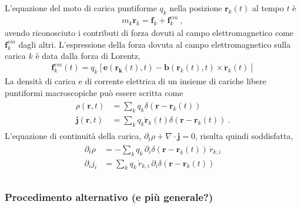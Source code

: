 \documentclass[letterpaper,10pt,italian]{jupyterBook}
\begin{document}
\sphinxAtStartPar
{}
L’equazione del moto di carica puntiforme \(q_k\) nella posizione \(\mathbf{r}_k(t)\) al tempo \(t\) è
\begin{equation*}
\begin{split}m_k \ddot{\mathbf{r}}_k = \mathbf{f}_k + \mathbf{f}_k^{em} \ ,\end{split}
\end{equation*}
\sphinxAtStartPar
avendo riconosciuto i contributi di forza dovuti al campo elettromagnetico come \(\mathbf{f}_k^{em}\) dagli altri. L’espressione della forza dovuta al campo elettromagnetico sulla carica \(k\) è data dalla forza di Lorentz,
\begin{equation*}
\begin{split}\mathbf{f}_k^{em}(t) = q_k \left[ \mathbf{e}(\mathbf{r_k}(t), t) - \mathbf{b}(\mathbf{r}_k(t), t) \times \dot{\mathbf{r}}_k(t) \right]\end{split}
\end{equation*}
\sphinxAtStartPar
{} La densità di carica e di corrente elettrica di un insieme di cariche libere puntiformi macroscopiche può essere scritta come
\begin{equation*}
\begin{split}\begin{aligned}
  \rho(\mathbf{r},t) & = \sum_k q_k \delta(\mathbf{r} - \mathbf{r}_k(t)) \\
  \mathbf{j}(\mathbf{r},t) & = \sum_k q_k \dot{\mathbf{r}}_k(t) \delta(\mathbf{r} - \mathbf{r}_k(t)) \ .
\end{aligned}\end{split}
\end{equation*}
\sphinxAtStartPar
L’equazione di continuità della carica, \(\partial_t \rho + \nabla \cdot \mathbf{j} = 0\), risulta quindi soddisfatta,
\begin{equation*}
\begin{split}\begin{aligned}
  \partial_t \rho &  = - \sum_k q_k \, \partial_i \delta(\mathbf{r} - \mathbf{r}_k(t)) \, \dot{r}_{k,i} \\
  \partial_i j_i  &  =   \sum_k q_k \, \dot{r}_{k,i} \, \partial_i \delta(\mathbf{r} - \mathbf{r}_k(t)) \\
\end{aligned}\end{split}
\end{equation*}\subsubsection*{Procedimento alternativo (e più generale?)}
\end{document}
